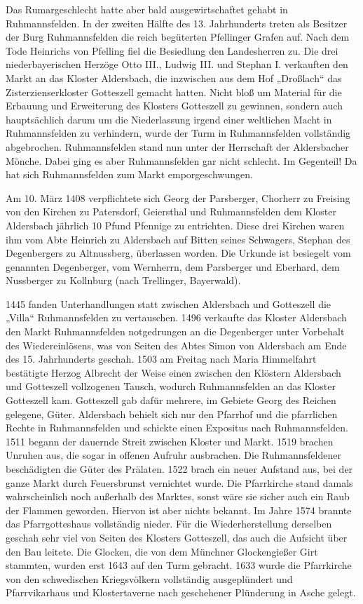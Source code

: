 \documentclass[12pt,a4paper]{book}
\begin{document}
Das Rumargeschlecht hatte aber bald ausgewirtschaftet gehabt in Ruhmannsfelden.
In der zweiten Hälfte des 13. Jahrhunderts treten als Besitzer der Burg
Ruhmannsfelden die reich begüterten Pfellinger Grafen auf. Nach dem Tode
Heinrichs von Pfelling fiel die Besiedlung den Landesherren zu. Die drei
niederbayerischen Herzöge Otto III., Ludwig III. und Stephan I. verkauften den
Markt an das Kloster Aldersbach, die inzwischen aus dem Hof „Droßlach“ das
Zisterzienserkloster Gotteszell gemacht hatten. Nicht bloß um Material für die
Erbauung und Erweiterung des Klosters Gotteszell zu gewinnen, sondern auch
hauptsächlich darum um die Niederlassung irgend einer weltlichen Macht in
Ruhmannsfelden zu verhindern, wurde der Turm in Ruhmannsfelden vollständig
abgebrochen. Ruhmannsfelden stand nun unter der Herrschaft der Aldersbacher
Mönche. Dabei ging es aber Ruhmannsfelden gar nicht schlecht. Im Gegenteil! Da
hat sich Ruhmannsfelden zum Markt emporgeschwungen.

Am 10. März 1408 verpflichtete sich Georg der Parsberger, Chorherr zu Freising
von den Kirchen zu Patersdorf, Geiersthal und Ruhmannsfelden dem Kloster
Aldersbach jährlich 10 Pfund Pfennige zu entrichten. Diese drei Kirchen waren
ihm vom Abte Heinrich zu Aldersbach auf Bitten seines Schwagers, Stephan des
Degenbergers zu Altnussberg, überlassen worden. Die Urkunde ist besiegelt vom
genannten Degenberger, vom Wernherrn, dem Parsberger und Eberhard, dem
Nussberger zu Kollnburg (nach Trellinger, Bayerwald).

1445 fanden Unterhandlungen statt zwischen Aldersbach und Gotteszell die „Villa“
Ruhmannsfelden zu vertauschen. 1496 verkaufte das Kloster Aldersbach den Markt
Ruhmannsfelden notgedrungen an die Degenberger unter Vorbehalt des
Wiedereinlösens, was von Seiten des Abtes Simon von Aldersbach am Ende des 15.
Jahrhunderts geschah. 1503 am Freitag nach Maria Himmelfahrt bestätigte Herzog
Albrecht der Weise einen zwischen den Klöstern Aldersbach und Gotteszell
vollzogenen Tausch, wodurch Ruhmannsfelden an das Kloster Gotteszell kam.
Gotteszell gab dafür mehrere, im Gebiete Georg des Reichen gelegene, Güter.
Aldersbach behielt sich nur den Pfarrhof und die pfarrlichen Rechte in
Ruhmannsfelden und schickte einen Expositus nach Ruhmannsfelden. 1511 begann der
dauernde Streit zwischen Kloster und Markt. 1519 brachen Unruhen aus, die sogar
in offenen Aufruhr ausbrachen. Die Ruhmannsfeldener beschädigten die Güter des
Prälaten. 1522 brach ein neuer Aufstand aus, bei der ganze Markt durch
Feuersbrunst vernichtet wurde. Die Pfarrkirche stand damals wahrscheinlich noch
außerhalb des Marktes, sonst wäre sie sicher auch ein Raub der Flammen geworden.
Hiervon ist aber nichts bekannt. Im Jahre 1574 brannte das Pfarrgotteshaus
vollständig nieder. Für die Wiederherstellung derselben geschah sehr viel von
Seiten des Klosters Gotteszell, das auch die Aufsicht über den Bau leitete. Die
Glocken, die von dem Münchner Glockengießer Girt stammten, wurden erst 1643 auf
den Turm gebracht. 1633 wurde die Pfarrkirche von den schwedischen Kriegsvölkern
vollständig ausgeplündert und Pfarrvikarhaus und Klostertaverne nach geschehener
Plünderung in Asche gelegt.
\end{document}
